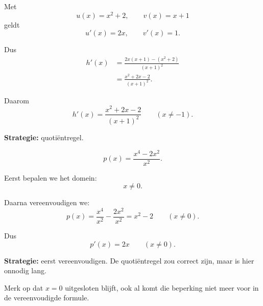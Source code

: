 \documentclass{ximera}
\begin{document}
\begin{oefening}{\oefU\ESS}
\begin{question}
\begin{oplossing}
  Met
  \[
  u(x)=x^2+2,
  \qquad
  v(x)=x+1
  \]
  geldt
  \[
  u'(x)=2x,
  \qquad
  v'(x)=1.
  \]
  
  Dus
  \[
  \begin{aligned}
  h'(x)
  &=
  \frac{
  2x(x+1)-(x^2+2)
  }{
  (x+1)^2
  }\\
  &=
  \frac{x^2+2x-2}{(x+1)^2}.
  \end{aligned}
  \]
  
  Daarom
  \[
  \boxed{
  h'(x)=\frac{x^2+2x-2}{(x+1)^2}
  }
  \qquad (x\neq-1).
  \]
  
  \textbf{Strategie:} quotiëntregel.
  \end{oplossing}
  
  \end{question}
  
  
  \begin{question}
  
  \[
  p(x)=\frac{x^4-2x^2}{x^2}.
  \]
  
  \begin{oplossing}
  Eerst bepalen we het domein:
  \[
  x\neq0.
  \]
  
  Daarna vereenvoudigen we:
  \[
  p(x)
  =
  \frac{x^4}{x^2}
  -
  \frac{2x^2}{x^2}
  =
  x^2-2
  \qquad (x\neq0).
  \]
  
  Dus
  \[
  \boxed{
  p'(x)=2x
  }
  \qquad (x\neq0).
  \]
  
  \textbf{Strategie:} eerst vereenvoudigen. De quotiëntregel zou correct
  zijn, maar is hier onnodig lang.
  
  Merk op dat $x=0$ uitgesloten blijft, ook al komt die beperking
  niet meer voor in de vereenvoudigde formule.
  \end{oplossing}
  
  \end{question}
  
  \end{oefening}
  
  
  
\end{document}
